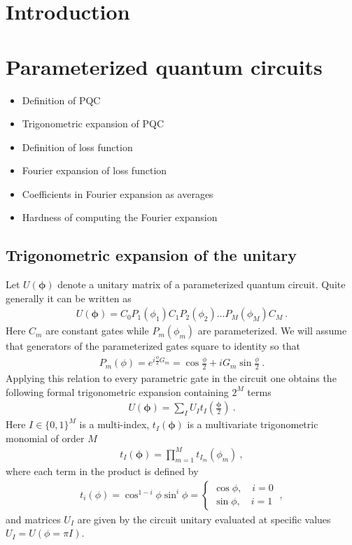 \documentclass[twocolumn, amsfonts, amssymb, aps, nofootinbib]{revtex4-2}
\begin{document}
\maketitle

\tableofcontents

\section{Introduction}
\section{Parameterized quantum circuits}
\begin{itemize}
	\item Definition of PQC
	\item Trigonometric expansion of PQC
	\item Definition of loss function
	\item Fourier expansion of loss function
	\item Coefficients in Fourier expansion as averages
	\item Hardness of computing the Fourier expansion
\end{itemize}
\subsection{Trigonometric expansion of the unitary}
Let $U(\pmb{\phi})$ denote a unitary matrix of a parameterized quantum circuit. Quite generally it can be written as 
\begin{align}
	U(\pmb{\phi})=C_0 P_1(\phi_1)C_1P_2(\phi_2)\dots P_M(\phi_M) C_M \ . \label{U phi}
\end{align}
Here $C_m$ are constant gates while $P_m(\phi_m)$ are parameterized. We will assume that generators of the parameterized gates square to identity so that
\begin{align}
	P_m(\phi)=e^{i\frac{\phi}{2} G_m}=\cos\frac{\phi}{2}+iG_m\sin\frac{\phi}{2} \ .
\end{align}
Applying this relation to every parametric gate in the circuit one obtains the following formal trigonometric expansion containing $2^M$ terms
\begin{align}
	U(\pmb{\phi})=\sum_I U_I t_I\left(\frac{\pmb{\phi}}2\right) \ . \label{U expansion}
\end{align}
Here $I\in\{0,1\}^M$ is a multi-index, $t_I(\pmb{\phi})$ is a multivariate trigonometric monomial of order $M$
\begin{align}
	t_I(\pmb{\phi})=\prod_{m=1}^M t_{I_m}(\phi_m) \label{t def} \ ,
\end{align}
where each term in the product is defined by
\begin{align}
	t_i(\phi)=\cos^{1-i}\phi\sin^i\phi=\begin{cases}\cos\phi,\quad i=0\\\sin\phi,\quad i=1\end{cases} \ ,
\end{align}
and matrices $U_I$ are given by the circuit unitary evaluated at specific values $U_I=U(\phi=\pi I)$.
\end{document}
